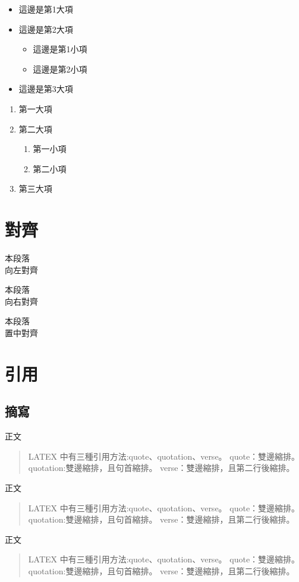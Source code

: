 \begin{itemize}
    \item 這邊是第1大項
    \item 這邊是第2大項
          \begin{itemize}
              \item 這邊是第1小項
              \item 這邊是第2小項
          \end{itemize}
    \item 這邊是第3大項
\end{itemize}

\begin{enumerate}
    \item 第一大項
    \item 第二大項
          \begin{enumerate}
              \item 第一小項
              \item 第二小項
          \end{enumerate}
    \item 第三大項
\end{enumerate}

\newpage

\section{對齊}
\begin{flushleft}
    本段落\\
    向左對齊
\end{flushleft}

\begin{flushright}
    本段落\\
    向右對齊
\end{flushright}

\begin{center}
    本段落\\
    置中對齊
\end{center}

\section{引用}
\subsection{摘寫}\label{ssec_qute}
正文
\begin{quote}
    LATEX 中有三種引用方法:quote、quotation、verse。
    quote：雙邊縮排。
    quotation:雙邊縮排，且句首縮排。
    verse：雙邊縮排，且第二行後縮排。
\end{quote}
正文
\begin{quotation}
    LATEX 中有三種引用方法:quote、quotation、verse。
    quote：雙邊縮排。
    quotation:雙邊縮排，且句首縮排。
    verse：雙邊縮排，且第二行後縮排。
\end{quotation}
正文
\begin{verse}
    LATEX 中有三種引用方法:quote、quotation、verse。
    quote：雙邊縮排。
    quotation:雙邊縮排，且句首縮排。
    verse：雙邊縮排，且第二行後縮排。
\end{verse}

